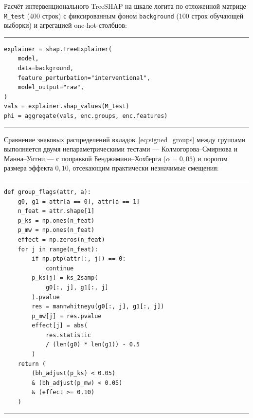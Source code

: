 \documentclass{misisarticle}
\begin{document}
Расчёт интервенционального TreeSHAP на шкале логита по отложенной матрице \texttt{M\_test} (400 строк) с фиксированным фоном \texttt{background} (100 строк обучающей выборки) и агрегацией one-hot-столбцов:

\par\vspace{3pt}
\noindent\begin{minipage}{\columnwidth}
\noindent\rule{\linewidth}{0.4pt}
\begingroup
\scriptsize
\begin{verbatim}
explainer = shap.TreeExplainer(
    model,
    data=background,
    feature_perturbation="interventional",
    model_output="raw",
)
vals = explainer.shap_values(M_test)
phi = aggregate(vals, enc.groups, enc.features)
\end{verbatim}
\endgroup
\vspace{-4pt}
\noindent\rule{\linewidth}{0.4pt}
\end{minipage}
\par\vspace{4pt}

Сравнение знаковых распределений вкладов~\eqref{eq:signed_groups} между группами выполняется двумя непараметрическими тестами — Колмогорова--Смирнова и Манна--Уитни — с поправкой Бенджамини--Хохберга ($\alpha = 0{,}05$) и порогом размера эффекта $0{,}10$, отсекающим практически незначимые смещения:

\par\vspace{3pt}
\noindent\begin{minipage}{\columnwidth}
\noindent\rule{\linewidth}{0.4pt}
\begingroup
\scriptsize
\begin{verbatim}
def group_flags(attr, a):
    g0, g1 = attr[a == 0], attr[a == 1]
    n_feat = attr.shape[1]
    p_ks = np.ones(n_feat)
    p_mw = np.ones(n_feat)
    effect = np.zeros(n_feat)
    for j in range(n_feat):
        if np.ptp(attr[:, j]) == 0:
            continue
        p_ks[j] = ks_2samp(
            g0[:, j], g1[:, j]
        ).pvalue
        res = mannwhitneyu(g0[:, j], g1[:, j])
        p_mw[j] = res.pvalue
        effect[j] = abs(
            res.statistic
            / (len(g0) * len(g1)) - 0.5
        )
    return (
        (bh_adjust(p_ks) < 0.05)
        & (bh_adjust(p_mw) < 0.05)
        & (effect >= 0.10)
    )
\end{verbatim}
\endgroup
\vspace{-4pt}
\noindent\rule{\linewidth}{0.4pt}
\end{minipage}
\par\vspace{4pt}
\end{document}
